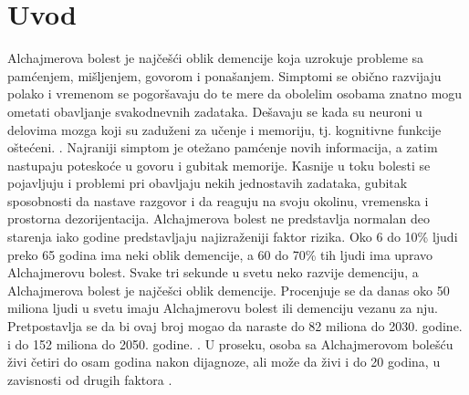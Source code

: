 \documentclass[12pt,oneside]{memoir}
\begin{document}
\frontmatter
\naslovna
\komisija

\tableofcontents{}

\mainmatter


\chapter{Uvod}

Alchajmerova bolest je najčešći oblik demencije koja uzrokuje probleme sa pamćenjem,  mišljenjem,  govorom i ponašanjem.  Simptomi se obično razvijaju polako i vremenom se pogoršavaju do te mere da obolelim osobama znatno mogu ometati obavljanje svakodnevnih zadataka.  Dešavaju se kada su neuroni u delovima mozga koji su zaduženi za učenje i memoriju, tj. kognitivne funkcije oštećeni. \cite{Alzheimerfactsfigures}.  Najraniji simptom je otežano pamćenje novih informacija, a zatim nastupaju poteskoće u govoru i gubitak memorije.  Kasnije u toku bolesti se pojavljuju i problemi pri obavljaju nekih jednostavih zadataka,  gubitak sposobnosti da nastave razgovor i da reaguju na svoju okolinu,  vremenska i prostorna dezorijentacija.  Alchajmerova bolest ne predstavlja normalan deo starenja iako godine predstavljaju najizraženiji faktor rizika.  Oko 6 do 10\% ljudi preko 65 godina ima neki oblik demencije,  a 60 do 70\% tih ljudi ima upravo Alchajmerovu bolest.\cite{actavis} Svake tri sekunde u svetu neko razvije demenciju, a Alchajmerova bolest je najčešci oblik demencije.  Procenjuje se da danas oko 50 miliona ljudi u svetu imaju Alchajmerovu bolest ili demenciju vezanu za nju.  Pretpostavlja se da bi ovaj broj mogao da naraste do 82 miliona do 2030.  godine. i do 152 miliona do 2050. godine.  \cite{Languageimpairment}.  U proseku, osoba sa Alchajmerovom bolešću živi četiri do osam godina nakon dijagnoze,  ali može da živi i do 20 godina, u zavisnosti od drugih faktora \cite{seracell}. 
\end{document}
